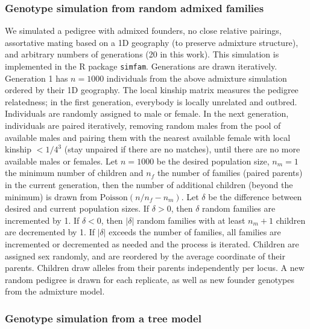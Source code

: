 \documentclass[11pt]{article}
\begin{document}
\subsubsection{Genotype simulation from random admixed families}

We simulated a pedigree with admixed founders, no close relative pairings, assortative mating based on a 1D geography (to preserve admixture structure), and arbitrary numbers of generations (20 in this work).
This simulation is implemented in the R package \texttt{simfam}.
Generations are drawn iteratively.
Generation 1 has $n=1000$ individuals from the above admixture simulation ordered by their 1D geography.
The local kinship matrix measures the pedigree relatedness; in the first generation, everybody is locally unrelated and outbred.
Individuals are randomly assigned to male or female.
In the next generation, individuals are paired iteratively, removing random males from the pool of available males and pairing them with the nearest available female with local kinship $< 1/4^3$ (stay unpaired if there are no matches), until there are no more available males or females.
Let $n=1000$ be the desired population size, $n_m=1$ the minimum number of children and $n_f$ the number of families (paired parents) in the current generation, then the number of additional children (beyond the minimum) is drawn from $\text{Poisson}(n/n_f - n_m)$.
Let $\delta$ be the difference between desired and current population sizes.
If $\delta > 0$, then $\delta$ random families are incremented by 1.
If $\delta < 0$, then $|\delta|$ random families with at least $n_m+1$ children are decremented by 1.
If $|\delta|$ exceeds the number of families, all families are incremented or decremented as needed and the process is iterated.
Children are assigned sex randomly, and are reordered by the average coordinate of their parents.
Children draw alleles from their parents independently per locus.
A new random pedigree is drawn for each replicate, as well as new founder genotypes from the admixture model.

\subsubsection{Genotype simulation from a tree model}
\end{document}
